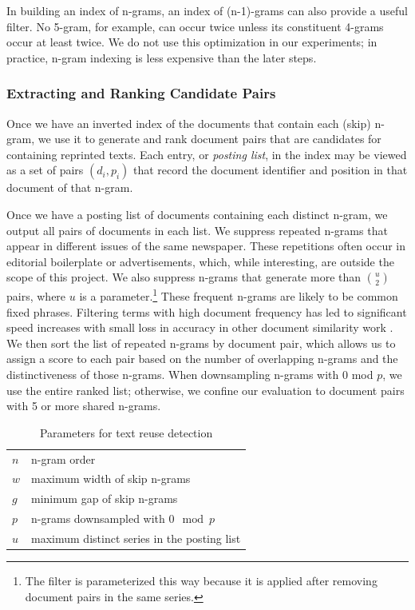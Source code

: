 \documentclass[pdftex,11pt]{article}
\begin{document}
In building an index of n-grams, an index of (n-1)-grams can also
provide a useful filter.  No 5-gram, for example, can occur twice
unless its constituent 4-grams occur at least twice.  We do not use
this optimization in our experiments; in practice, n-gram indexing is
less expensive than the later steps.

\subsubsection{Extracting and Ranking Candidate Pairs}
\label{sec:extracting-pairs}

Once we have an inverted index of the documents that contain each
(skip) n-gram, we use it to generate and rank document pairs that are
candidates for containing reprinted texts.  Each entry, or
\emph{posting list}, in the index may be viewed as a set of pairs
$(d_i, p_i)$ that record the document identifier and position in that
document of that n-gram.

Once we have a posting list of documents containing each distinct
n-gram, we output all pairs of documents in each list.  We suppress
repeated n-grams that appear in different issues of the same
newspaper. These repetitions often occur in editorial boilerplate or
advertisements, which, while interesting, are outside the scope of
this project.  We also suppress n-grams that generate more than $u
\choose 2$ pairs, where $u$ is a parameter.\footnote{The filter is
  parameterized this way because it is applied after removing document
  pairs in the same series.}  These frequent n-grams are likely to be
common fixed phrases.  Filtering terms with high document frequency
has led to significant speed increases with small loss in accuracy in
other document similarity work
\cite{elsayed08:_pairw_docum_simil_large_collec_mapred}.  We then sort
the list of repeated n-grams by document pair, which allows us to
assign a score to each pair based on the number of overlapping n-grams
and the distinctiveness of those n-grams.  When downsampling n-grams
with 0 mod $p$, we use the entire ranked list; otherwise, we confine
our evaluation to document pairs with 5 or more shared n-grams.

\begin{table}
  \centering
  \begin{tabular}{l l} \\
  $n$ & n-gram order \\
  $w$ & maximum width of skip n-grams \\
  $g$ & minimum gap of skip n-grams \\
  $p$ & n-grams downsampled with $0 \mod p$ \\
  $u$ & maximum distinct series in the posting
  list \\
  \end{tabular}
  \caption{Parameters for text reuse detection}
  \label{tab:parameters}
\end{table}
\end{document}
